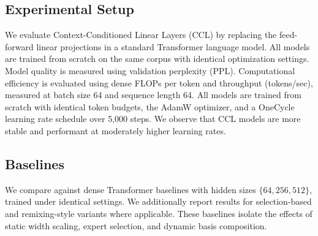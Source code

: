\documentclass[11pt]{article}
\begin{document}
\subsection{Experimental Setup}
We evaluate Context-Conditioned Linear Layers (CCL) by replacing the feed-forward linear projections in a standard Transformer language model. All models are trained from scratch on the same corpus with identical optimization settings. Model quality is measured using validation perplexity (PPL). Computational efficiency is evaluated using dense FLOPs per token and throughput (tokens/sec), measured at batch size 64 and sequence length 64.
All models are trained from scratch with identical token budgets, the AdamW optimizer, and a OneCycle learning rate schedule over 5,000 steps. We observe that CCL models are more stable and performant at moderately higher learning rates.
\begin{table}[t]
\centering
\caption{Perplexity results across all methods. The \textbf{CCL (64-dim)} approach outperforms all baselines, including the 512-dim Dense Baseline, despite using 8x fewer dimensions. \textbf{Bold} indicates best performance.}
\label{tab:combined_results}
\end{table}


\subsection{Baselines}
We compare against dense Transformer baselines with hidden sizes $\{64, 256, 512\}$, trained under identical settings. We additionally report results for selection-based and remixing-style variants where applicable. These baselines isolate the effects of static width scaling, expert selection, and dynamic basis composition.
\end{document}
